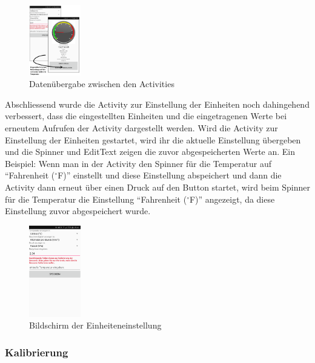 \begin{figure}[ht]
    \includegraphics[width=0.2\textwidth]{3Vorgehen/imag/onActivityResult.PNG}
    \caption{Datenübergabe zwischen den Activities}
	\label{onActivityResult} 
\end{figure}

Abschliessend wurde die Activity zur Einstellung der Einheiten noch dahingehend verbessert, dass die eingestellten Einheiten und die eingetragenen Werte bei erneutem Aufrufen der Activity dargestellt werden. Wird die Activity zur Einstellung der Einheiten gestartet, wird ihr die aktuelle Einstellung übergeben und die Spinner und EditText zeigen die zuvor abgespeicherten Werte an. Ein Beispiel: Wenn man in der Activity den Spinner für die Temperatur auf ``Fahrenheit ($^\circ$F)'' einstellt und diese Einstellung abspeichert und dann die Activity dann erneut über einen Druck auf den Button startet, wird beim Spinner für die Temperatur die Einstellung ``Fahrenheit ($^\circ$F)'' angezeigt, da diese Einstellung zuvor abgespeichert wurde.

\begin{figure}[ht]
    \includegraphics[width=0.2\textwidth]{3Vorgehen/imag/BLEEinheitenUndEinstellungenStart.png}
    \caption{Bildschirm der Einheiteneinstellung}
	\label{BLEEinheitenUndEinstellungenStart} 
\end{figure}


\subsubsection{Kalibrierung}

